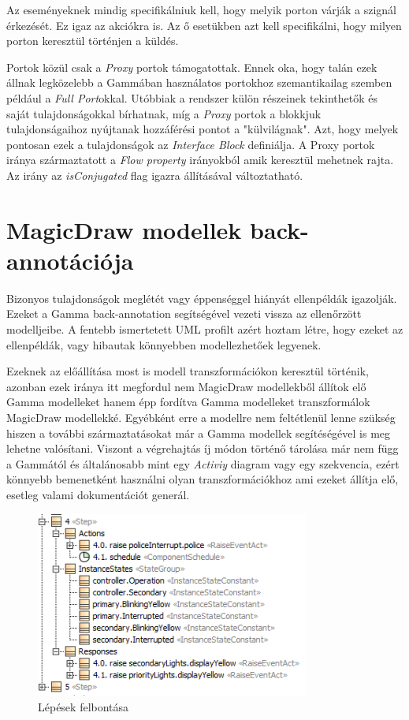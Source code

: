 Az eseményeknek mindig specifikálniuk kell, hogy melyik porton várják a szignál érkezését. Ez igaz az akciókra is. Az ő esetükben azt kell specifikálni, hogy milyen porton keresztül történjen a küldés.

Portok közül csak a \emph{Proxy} portok támogatottak. Ennek oka, hogy talán ezek állnak legközelebb a Gammában használatos portokhoz szemantikailag szemben például a \emph{Full Port}okkal. Utóbbiak a rendszer külön részeinek tekinthetők és saját tulajdonságokkal bírhatnak, míg a \emph{Proxy} portok a blokkjuk tulajdonságaihoz nyújtanak hozzáférési pontot a "külvilágnak". Azt, hogy melyek pontosan ezek a tulajdonságok az \emph{Interface Block} definiálja.
A Proxy portok iránya származtatott a \emph{Flow property} irányokból amik keresztül mehetnek rajta. Az irány az \emph{isConjugated} flag igazra állításával változtatható.


\section{MagicDraw modellek back-annotációja}

Bizonyos tulajdonságok meglétét vagy éppenséggel hiányát ellenpéldák igazolják. Ezeket a Gamma back-annotation segítségével vezeti vissza az ellenőrzött modelljeibe. A fentebb ismertetett UML profilt azért hoztam létre, hogy ezeket az ellenpéldák, vagy hibautak könnyebben modellezhetőek legyenek.

Ezeknek az előállítása most is modell transzformációkon keresztül történik, azonban ezek iránya itt megfordul nem MagicDraw modellekből állítok elő Gamma modelleket hanem épp fordítva Gamma modelleket transzformálok MagicDraw modellekké. Egyébként erre a modellre nem feltétlenül lenne szükség hiszen a további származtatásokat már a Gamma modellek segítéségével is meg lehetne valósítani. Viszont a végrehajtás íj módon történő tárolása már nem függ a Gammától és általánosabb mint egy \emph{Activiy} diagram vagy egy szekvencia, ezért könnyebb bemenetként használni olyan transzformációkhoz ami ezeket állítja elő, esetleg valami dokumentációt generál.

\begin{figure}[!ht]
	\centering
	\includegraphics[width=90mm, keepaspectratio]{figures/contribution/steps.png}
	\caption{Lépések felbontása}
	\label{fig:steps}
\end{figure}


